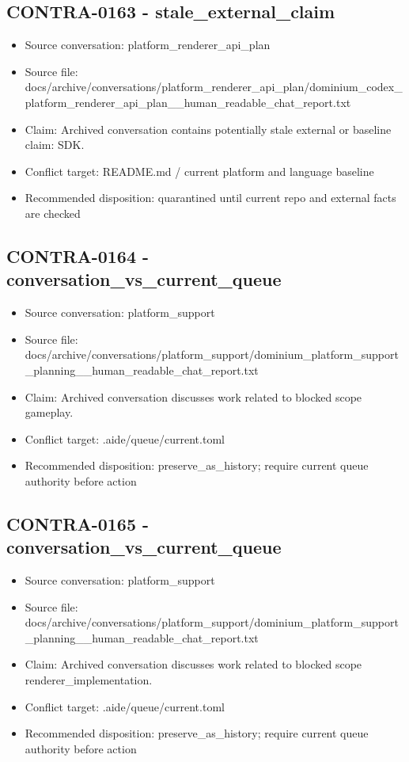 \documentclass[11pt,a4paper]{report}
\begin{document}
\subsection{CONTRA-0163 - stale\_external\_claim}

\begin{itemize}
\item Source conversation: platform\_renderer\_api\_plan
\item Source file: docs/archive/conversations/platform\_renderer\_api\_plan/dominium\_codex\_platform\_renderer\_api\_plan\_\_human\_readable\_chat\_report.txt
\item Claim: Archived conversation contains potentially stale external or baseline claim: SDK.
\item Conflict target: README.md / current platform and language baseline
\item Recommended disposition: quarantined until current repo and external facts are checked
\end{itemize}

\subsection{CONTRA-0164 - conversation\_vs\_current\_queue}

\begin{itemize}
\item Source conversation: platform\_support
\item Source file: docs/archive/conversations/platform\_support/dominium\_platform\_support\_planning\_\_human\_readable\_chat\_report.txt
\item Claim: Archived conversation discusses work related to blocked scope gameplay.
\item Conflict target: .aide/queue/current.toml
\item Recommended disposition: preserve\_as\_history; require current queue authority before action
\end{itemize}

\subsection{CONTRA-0165 - conversation\_vs\_current\_queue}

\begin{itemize}
\item Source conversation: platform\_support
\item Source file: docs/archive/conversations/platform\_support/dominium\_platform\_support\_planning\_\_human\_readable\_chat\_report.txt
\item Claim: Archived conversation discusses work related to blocked scope renderer\_implementation.
\item Conflict target: .aide/queue/current.toml
\item Recommended disposition: preserve\_as\_history; require current queue authority before action
\end{itemize}
\end{document}
